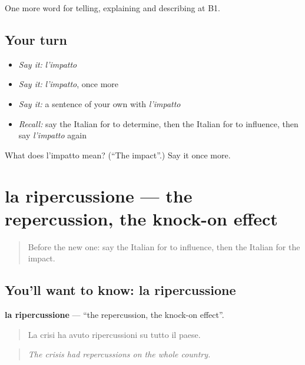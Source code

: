\begin{grammarlens}[title={What you've built}]
One more word for telling, explaining and describing at B1.
\end{grammarlens}

\subsection*{Your turn}
\begin{itemize}
\raggedright
  \item \emph{Say it:} \emph{l'impatto}
  \item \emph{Say it:} \emph{l'impatto}, once more
  \item \emph{Say it:} a sentence of your own with \emph{l'impatto}
  \item \emph{Recall:} say the Italian for to determine, then the Italian for to influence, then say \emph{l'impatto} again
\end{itemize}

\begin{tcolorbox}[breakable,colback=teal!4,colframe=teal!35!black,title={Before you move on}]
What does l'impatto mean? (\textquotedblleft{}The impact\textquotedblright{}.) Say it once more.
\end{tcolorbox}
\section[la ripercussione]{la ripercussione — the repercussion, the knock-on effect}

\label{lesson:IT-C352-ripercussione}



\begin{quote}
Before the new one: say the Italian for to influence, then the Italian for the impact.
\end{quote}

\subsection*{You'll want to know: la ripercussione}
\textbf{la ripercussione} — \textquotedblleft{}the repercussion, the knock-on effect\textquotedblright{}.

\begin{quote}
La crisi ha avuto ripercussioni su tutto il paese.
\end{quote}

\begin{quote}
\emph{The crisis had repercussions on the whole country.}
\end{quote}

